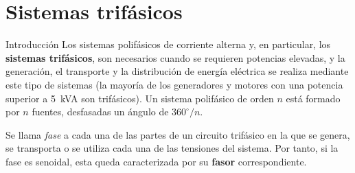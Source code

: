 \documentclass[11pt]{book} %
\makeatletter
\numberwithin{dummy}{section}
\theoremstyle{ocrenumbox}
\theoremstyle{blacknumex}
\theoremstyle{blacknumbox}
\theoremstyle{ocrenum}
\newenvironment{remark}{\par\vspace{10pt}\small %
\begin{list}{}{
\leftmargin=35pt %
\rightmargin=25pt}\item\ignorespaces %
\makebox[-2.5pt]{\begin{tikzpicture}[overlay]
\node[draw=ocre!60,line width=1pt,circle,fill=ocre!25,font=\sffamily\bfseries,inner sep=2pt,outer sep=0pt] at (-15pt,0pt){\textcolor{ocre}{N}};\end{tikzpicture}} %
\advance\baselineskip -1pt}{\end{list}\vskip5pt} %
\renewcommand{\section}{\@startsection{section}{1}{\z@}
{-4ex \@plus -1ex \@minus -.4ex}
{1ex \@plus.2ex }
{\normalfont\large\sffamily\bfseries}}
\newlength\esp
\newcommand{\thechapterimage}{}%
\newcommand{\chapterimage}[1]{\renewcommand{\thechapterimage}{#1}}%
\makeatother
\begin{document}
	
	\chapterimage{imagen_t3.jpeg}
	\chapter{Sistemas trifásicos}
	
	
	\section{Introducción}
	Los sistemas polifásicos de corriente alterna y, en particular, los \textbf{sistemas trifásicos}, son necesarios cuando se requieren potencias elevadas, y la generación, el transporte y la distribución de energía eléctrica se realiza mediante este tipo de sistemas (la mayoría de los generadores y motores con una potencia superior a 5~kVA son trifásicos). Un sistema polifásico de orden $n$ está formado por $n$ fuentes, desfasadas un ángulo de $360^\circ/n$. 
	\begin{remark}
		Se llama \textit{fase} a cada una de las partes de un circuito trifásico en la que se genera, se transporta o se utiliza cada una de las tensiones del sistema. Por tanto, si la fase es senoidal, esta queda caracterizada por su \textbf{fasor} correspondiente.
	\end{remark}
	
\end{document}
